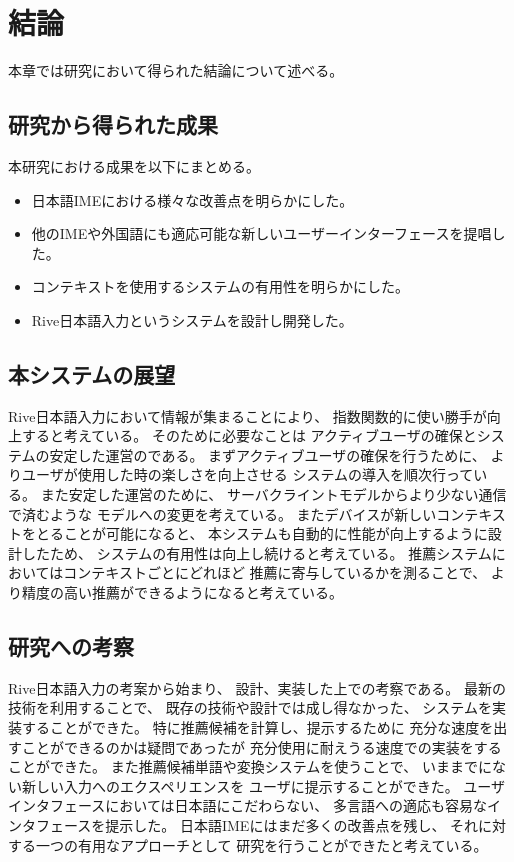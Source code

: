 \chapter{結論}
\label{chap:conclusion}
本章では研究において得られた結論について述べる。

\newpage
\section{研究から得られた成果}
本研究における成果を以下にまとめる。
\begin{itemize}
  \item 日本語IMEにおける様々な改善点を明らかにした。
  \item 他のIMEや外国語にも適応可能な新しいユーザーインターフェースを提唱した。
  \item コンテキストを使用するシステムの有用性を明らかにした。
  \item Rive日本語入力というシステムを設計し開発した。
\end{itemize}

\section{本システムの展望}
Rive日本語入力において情報が集まることにより、
指数関数的に使い勝手が向上すると考えている。
そのために必要なことは
アクティブユーザの確保とシステムの安定した運営のである。
まずアクティブユーザの確保を行うために、
よりユーザが使用した時の楽しさを向上させる
システムの導入を順次行っている。
また安定した運営のために、
サーバクライントモデルからより少ない通信で済むような
モデルへの変更を考えている。
またデバイスが新しいコンテキストをとることが可能になると、
本システムも自動的に性能が向上するように設計したため、
システムの有用性は向上し続けると考えている。
推薦システムにおいてはコンテキストごとにどれほど
推薦に寄与しているかを測ることで、
より精度の高い推薦ができるようになると考えている。

\section{研究への考察}
Rive日本語入力の考案から始まり、
設計、実装した上での考察である。
最新の技術を利用することで、
既存の技術や設計では成し得なかった、
システムを実装することができた。
特に推薦候補を計算し、提示するために
充分な速度を出すことができるのかは疑問であったが
充分使用に耐えうる速度での実装をすることができた。
また推薦候補単語や変換システムを使うことで、
いままでにない新しい入力へのエクスペリエンスを
ユーザに提示することができた。
ユーザインタフェースにおいては日本語にこだわらない、
多言語への適応も容易なインタフェースを提示した。
日本語IMEにはまだ多くの改善点を残し、
それに対する一つの有用なアプローチとして
研究を行うことができたと考えている。
